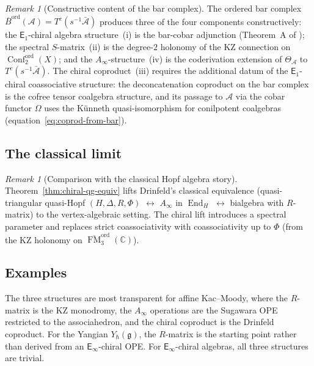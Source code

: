\documentclass[11pt,reqno]{amsart}
\theoremstyle{definition}
\theoremstyle{remark}
\newtheorem{remark}[theorem]{Remark}
\newcommand{\cA}{\mathcal{A}}
\newcommand{\Ainf}{A_{\infty}}
\newcommand{\Eone}{\mathsf{E}_{1}}
\newcommand{\Einf}{\mathsf{E}_{\infty}}
\DeclareMathOperator{\End}{End}
\DeclareMathOperator{\Conf}{Conf}
\DeclareMathOperator{\FM}{FM}
\newcommand{\fg}{\mathfrak{g}}
\newcommand{\Barord}{\overline{B}^{\mathrm{ord}}}
\newcommand{\CC}{\mathbb{C}}
\numberwithin{equation}{section}
\begin{document}
\begin{remark}[Constructive content of the bar complex]
\label{rem:chiral-yangian-bar}
The ordered bar complex
$\Barord(\cA) = T^c(s^{-1}\bar{\cA})$ produces three of the
four components constructively: the $\Eone$-chiral algebra
structure~(i) is the bar-cobar adjunction
\textup{(}Theorem~A of \cite{Lorgat26I}\textup{)}; the
spectral $S$-matrix~(ii) is the degree-$2$ holonomy of the
KZ connection on $\Conf_2^{\mathrm{ord}}(X)$; and the
$\Ainf$-structure~(iv) is the coderivation extension of
$\Theta_\cA$ to $T^c(s^{-1}\bar{\cA})$. The chiral
coproduct~(iii) requires the additional datum of the
$\Eone$-chiral coassociative structure: the deconcatenation coproduct on the
bar complex is the cofree tensor coalgebra structure, and its passage
to $\cA$ via the cobar functor $\Omega$ uses the
K\"unneth quasi-isomorphism for conilpotent coalgebras
\textup{(}equation~\textup{\eqref{eq:coprod-from-bar}}\textup{)}.
\end{remark}


\subsection{The classical limit}
\label{subsec:classical-limit}

\begin{remark}[Comparison with the classical Hopf algebra
story]
\label{rem:classical-hopf}
Theorem~\ref{thm:chiral-qg-equiv} lifts Drinfeld's
classical equivalence (quasi-triangular quasi-Hopf
$(H,\Delta,R,\Phi)$ $\leftrightarrow$ $\Ainf$ in $\End_H$
$\leftrightarrow$ bialgebra with $R$-matrix) to the
vertex-algebraic setting. The chiral lift introduces a
spectral parameter and replaces strict coassociativity with
coassociativity up to $\Phi$ (from the KZ holonomy on
$\overline{\FM}_3^{\mathrm{ord}}(\CC)$).
\end{remark}


\subsection{Examples}
\label{subsec:cqg-examples}

The three structures are most transparent for affine
Kac--Moody, where the $R$-matrix is the KZ monodromy, the
$\Ainf$ operations are the Sugawara OPE restricted to the
associahedron, and the chiral coproduct is the Drinfeld
coproduct. For the Yangian $Y_\hbar(\fg)$, the $R$-matrix
is the starting point rather than derived from an
$\Einf$-chiral OPE. For $\Einf$-chiral algebras, all three
structures are trivial.
\end{document}
